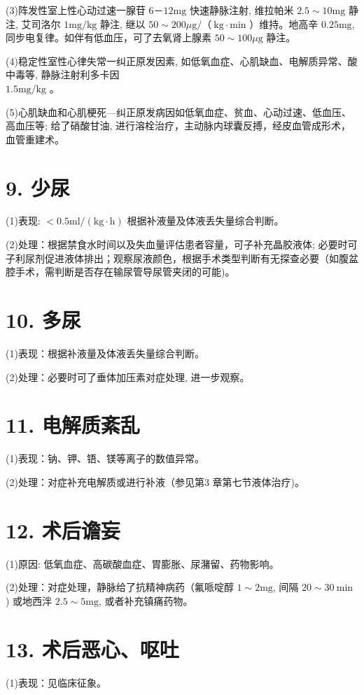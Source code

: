 \documentclass[10pt]{article}
\begin{document}
(3)阵发性室上性心动过速一腺苷 $6 － 12 \mathrm{mg}$ 快速静脉注射, 维拉帕米 $2.5 \sim 10 \mathrm{mg}$ 静注, 艾司洛尔 $1 \mathrm{mg} / \mathrm{kg}$ 静注, 继以 $50 \sim 200 \mu \mathrm{g} / （ \mathrm{~kg} \cdot \mathrm{min}$ ）维持。地高辛 $0.25 \mathrm{mg}$, 同步电复律。如伴有低血压，可了去氧肾上腺素 $50 \sim 100 \mu \mathrm{g}$ 静注。

(4)稳定性室性心律失常一纠正原发因素, 如低氧血症、心肌缺血、电解质异常、酸中毒等, 静脉注射利多卡因\\
$1.5 \mathrm{mg} / \mathrm{kg}$ 。

(5)心肌缺血和心肌梗死—纠正原发病因如低氧血症、贫血、心动过速、低血压、高血压等; 给了硝酸甘油, 进行溶栓治疗，主动脉内球囊反搏，经皮血管成形术，血管重建术。

\section*{9. 少尿}
(1)表现: $<0.5 \mathrm{ml} /(\mathrm{kg} \cdot \mathrm{h})$ 根据补液量及体液丢失量综合判断。

(2)处理：根据禁食水时间以及失血量评估患者容量，可子补充晶胶液体; 必要时可子利尿剂促进液体排出；观察尿液颜色，根据手术类型判断有无探查必要（如腹盆腔手术，需判断是否存在输尿管导尿管夹闭的可能)。

\section*{10. 多尿}
(1)表现：根据补液量及体液丢失量综合判断。

(2)处理：必要时可了垂体加压素对症处理, 进一步观察。

\section*{11. 电解质紊乱}
(1)表现：钠、钾、铻、镁等离子的数值异常。

(2)处理：对症补充电解质或进行补液（参见第3 章第七节液体治疗)。

\section*{12. 术后谵妄}
(1)原因: 低氧血症、高碳酸血症、胃膨胀、尿潴留、药物影响。

(2)处理：对症处理，静脉给了抗精神病药（氟哌啶醇 $1 \sim 2 \mathrm{mg}$, 间隔 $20 \sim 30 \mathrm{~min}$ ) 或地西泮 $2.5 \sim 5 \mathrm{mg}$, 或者补充镇痛药物。

\section*{13. 术后恶心、呕吐}
(1)表现：见临床征象。
\end{document}
